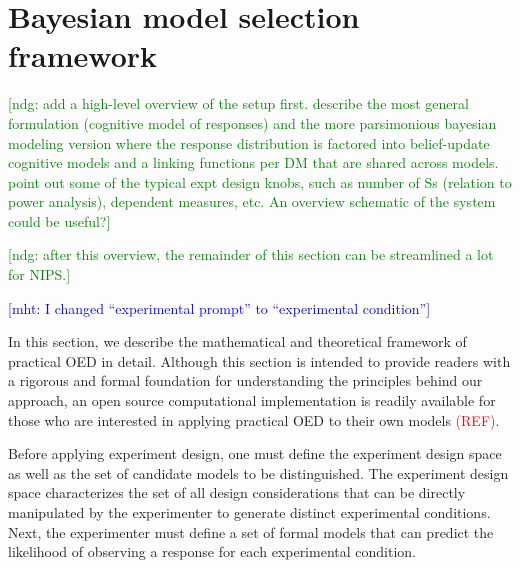 \documentclass{article}
\newcommand{\red}[1]{\textcolor{Red}{#1}}
\newcommand{\ndg}[1]{\textcolor{Green}{[ndg: #1]}}
\newcommand{\mht}[1]{\textcolor{Blue}{[mht: #1]}}
\begin{document}
\section{Bayesian model selection framework}
\label{s:bayes}

\ndg{add a high-level overview of the setup first. describe the most general formulation (cognitive model of responses) and the more parsimonious bayesian modeling version where the response distribution is factored into belief-update cognitive models and a linking functions per DM that are shared across models.  point out some of the typical expt design knobs, such as number of Ss (relation to power analysis), dependent measures, etc. An overview schematic of the system could be useful?}

\ndg{after this overview, the remainder of this section can be streamlined a lot for NIPS.}

\mht{I changed ``experimental prompt'' to ``experimental condition''}

In this section, we describe the mathematical and theoretical framework of practical OED in detail. Although this section is intended to provide readers with a rigorous and formal foundation for understanding the principles behind our approach, an open source computational implementation is readily available for those who are interested in applying practical OED to their own models \red{(REF)}.

Before applying experiment design, one must define the experiment design space as well as the set of candidate models to be distinguished. The experiment design space characterizes the set of all design considerations that can be directly manipulated by the experimenter to generate distinct experimental conditions. Next, the experimenter must define a set of formal models that can predict the likelihood of observing a response for each experimental condition.
\end{document}
